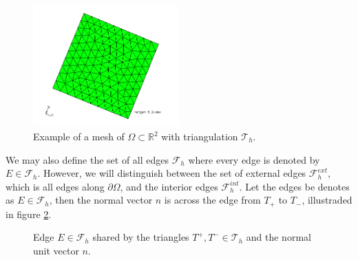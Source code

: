 \begin{figure}[!h]
    \centering
    \includegraphics[width=0.5\textwidth]{figures/mesh.jpg}
    \caption{Example of a mesh of $\Omega \subset \mathbb{R} ^{2}$ with triangulation $\mathcal{T} _{h}$.    }
    \label{fig:mesh_example}
\end{figure}

We may also define the set of all edges $\mathcal{F}_{h}$ where every edge is denoted by $E \in \mathcal{F} _{h}$. However, we will distinguish between the
set of external edges $\mathcal{F}^{ext} _{h}$, which is all edges along $\partial \Omega $, and the interior edges $\mathcal{F} ^{int}_{h}$. Let the edges be denotes as $E \in \mathcal{F } _{h}$, then the normal vector $n$ is across the edge from
$T_{+}$ to $T_{-}$, illustraded in figure \ref{fig:normal}.

\begin{figure}[!h]
\centering
{}
\caption{Edge $E \in \mathcal{F}_h $ shared by the triangles $T^{+}, T^{-} \in \mathcal{T}_{h} $ and the normal unit vector $n$.  }
    \label{fig:normal}
\end{figure}



